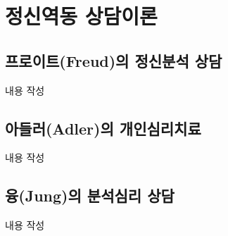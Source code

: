 \section{정신역동 상담이론}

\subsection{프로이트(Freud)의 정신분석 상담}
내용 작성

\subsection{아들러(Adler)의 개인심리치료}
내용 작성

\subsection{융(Jung)의 분석심리 상담}
내용 작성
